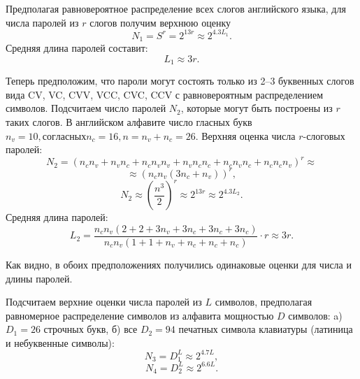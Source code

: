 Предполагая равновероятное распределение всех слогов английского языка, для числа паролей из $r$ слогов получим верхнюю оценку
    \[ N_1 = S^r = 2^{13 r} \approx 2^{4.3 L_1}. \]
Средняя длина паролей составит:
    \[ L_1 \approx 3 r. \]

Теперь предположим, что пароли могут состоять только из 2--3 буквенных слогов вида CV, VC, CVV, VCC, CVC, CCV с равновероятным распределением символов. Подсчитаем число паролей $N_2$, которые могут быть построены из $r$ таких слогов. В английском алфавите число гласных букв $n_v = 10, согласных n_c = 16, n = n_v + n_c = 26$. Верхняя оценка числа $r$-слоговых паролей:
    \[ N_2 = (n_c n_v + n_v n_c + n_c n_v n_v + n_v n_c n_c + n_c n_v n_c + n_c n_c n_v)^r \approx \]
        \[ \approx \left( n_c n_v(3 n_c + n_v) \right)^r, \]
    \[ N_2 \approx \left( \frac{n^3}{2} \right)^r \approx 2^{13 r} \approx 2^{4.3 L_2}. \]
Средняя длина паролей:
    \[ L_2 = \frac{n_c n_v(2 + 2 + 3 n_v + 3 n_c + 3 n_c + 3 n_c)}{n_c n_v (1 + 1 + n_v + n_c + n_c + n_c)} \cdot r \approx 3 r. \]

Как видно, в обоих предположениях получились одинаковые оценки для числа и длины паролей.

Подсчитаем верхние оценки числа паролей из $L$ символов, предполагая равномерное распределение символов из алфавита мощностью $D$ символов: a) $D_1 = 26$ строчных букв, б) все $D_2 = 94$ печатных символа клавиатуры (латиница и небуквенные символы):
    \[ N_3 = D_1^L \approx 2^{4.7 L}, \]
    \[ N_4 = D_2^L \approx 2^{6.6 L}. \]

\begin{table}[!ht]
    \caption{Различные верхние оценки числа паролей\label{tab:password-number}}
\end{table}

